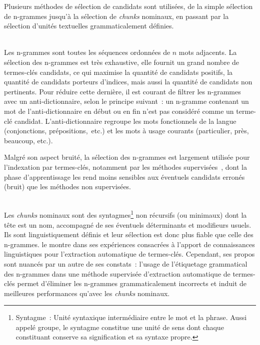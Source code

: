     Plusieurs méthodes de sélection de candidats sont utilisées, de la simple
    sélection de n-grammes jusqu'à la sélection de \textit{chunks} nominaux, en
    passant par la sélection d'unités textuelles grammaticalement définies.

    ~\\Les n-grammes sont
    toutes les séquences ordonnées de $n$ mots adjacents. La sélection des
    n-grammes est très exhaustive, elle fournit un grand nombre de termes-clés
    candidats, ce qui maximise la quantité de candidats positifs, la quantité de
    candidats porteurs d'indices, mais aussi la quantité de candidats non
    pertinents. Pour réduire cette dernière, il est courant de filtrer les
    n-grammes avec un
    anti-dictionnaire, selon le principe suivant~: un n-gramme
    contenant un mot de l'anti-dictionnaire en début ou en fin n'est pas
    considéré comme un terme-clé candidat. L'anti-dictionnaire regroupe les mots
    fonctionnels de la langue (conjonctions, prépositions,~etc.) et les mots à
    usage courants (\og{}particulier\fg{}, \og{}près\fg{}, \og{}beaucoup\fg{},
    etc.).
    
    Malgré son aspect bruité, la sélection des n-grammes est largement utilisée
    pour l'indexation par termes-clés, notamment par les méthodes
    supervisées~\cite{witten1999kea,turney1999learningalgorithms,hulth2003keywordextraction},
    dont la phase d'apprentissage les rend moins sensibles aux éventuels
    candidats erronés (bruit) que les méthodes non supervisées.

    \begin{example}
    \end{example}

    ~\\Les \textit{chunks} nominaux
    sont des syntagmes\footnote{Syntagme~: Unité syntaxique
    intermédiaire entre le mot et la phrase. Aussi appelé groupe, le syntagme
    constitue une unité de sens dont chaque constituant conserve sa
    signification et sa syntaxe propre.} non récursifs (ou minimaux) dont la
    tête est un nom, accompagné de ses éventuels déterminants et modifieurs
    usuels. Ils sont linguistiquement définis et leur sélection est donc plus
    fiable que celle des n-grammes.  le
    montre dans ses expériences consacrées à l'apport de connaissances
    linguistiques pour l'extraction automatique de termes-clés. Cependant, ses
    propos sont nuancés par un autre de ses constats~: l'usage de l'étiquetage
    grammatical des n-grammes dans une méthode supervisée d'extraction
    automatique de termes-clés permet d'éliminer les n-grammes grammaticalement
    incorrects et induit de meilleures performances qu'avec les \textit{chunks}
    nominaux.

